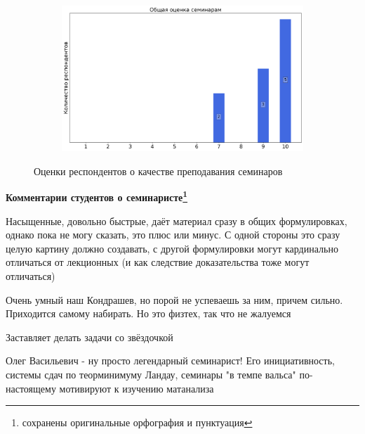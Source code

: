 \begin{figure}[H]
\begin{subfigure}[b]{0.45\textwidth}
			\end{subfigure}
			\begin{subfigure}[b]{0.45\textwidth}
				\centering
				\includegraphics[width=\textwidth]{images/1 course/Математический анализ/seminarists-marks-Кондрашов О.В.-3.png}
			\end{subfigure}	
			\caption{Оценки респондентов о качестве преподавания семинаров}
		\end{figure}

		\textbf{Комментарии студентов о семинаристе\protect\footnote{сохранены оригинальные орфография и пунктуация}}
			\begin{commentbox} 
				Насыщенные, довольно быстрые, даёт материал сразу в общих формулировках, однако пока не могу сказать, это плюс или минус. С одной стороны это сразу целую картину должно создавать, с другой формулировки могут кардинально отличаться от лекционных (и как следствие доказательства тоже могут отличаться) 
			\end{commentbox} 
		
			\begin{commentbox} 
				Очень умный наш Кондрашев, но порой не успеваешь за ним, причем сильно. Приходится самому набирать. Но это физтех, так что не жалуемся  
			\end{commentbox} 
		
			\begin{commentbox} 
				Заставляет делать задачи со звёздочкой 
			\end{commentbox} 
		
			\begin{commentbox} 
				Олег Васильевич - ну просто легендарный семинарист! Его инициативность, системы сдач по теорминимуму Ландау, семинары "в темпе вальса" по-настоящему мотивируют к изучению матанализа 
			\end{commentbox} 

